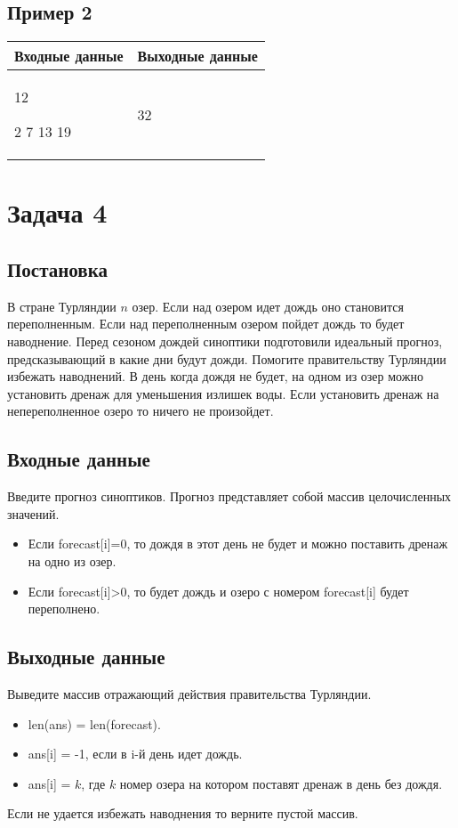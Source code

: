 \documentclass[a4]{article}
\begin{document}
\subsection*{Пример 2}
\label{sec:orge96f7c4}

\begin{table}[H]
\begin{center}
\begin{tabular}{|m{4cm}|m{4cm}|}
\hline
Входные данные & Выходные данные \\ \hline
12 

2 7 13 19
&
32
\\ \hline
\end{tabular}
\end{center}
\end{table}

\pagebreak
\section*{Задача 4}
\label{sec:orgb1f46a6}
\subsection*{Постановка}
\label{sec:orge854c50}
В стране Турляндии \(n\) озер. Если над озером идет дождь оно становится переполненным. Если над переполненным озером пойдет дождь то будет наводнение. Перед сезоном дождей синоптики подготовили идеальный прогноз, предсказывающий в какие дни будут дожди. Помогите правительству Турляндии избежать наводнений. В день когда дождя не будет, на одном из озер можно установить дренаж для уменьшения излишек воды. Если установить дренаж на непереполненное озеро то ничего не произойдет.

\subsection*{Входные данные}
\label{sec:orge854c50}
Введите прогноз синоптиков. Прогноз представляет собой массив целочисленных значений.
\begin{itemize}
    \item Если forecast[i]=0, то дождя в этот день не будет и можно поставить дренаж на одно из озер.
    \item Если forecast[i]>0, то будет дождь и озеро с номером forecast[i] будет переполнено.
 \end{itemize}
\subsection*{Выходные данные}
\label{sec:org1ab7414}
Выведите массив отражающий действия правительства Турляндии.
\begin{itemize}
    \item len(ans) = len(forecast).
    \item ans[i] = -1, если в i-й день идет дождь.
    \item ans[i] = \(k\), где \(k\) номер озера на котором поставят дренаж в день без дождя.
 \end{itemize}
 Если не удается избежать наводнения то верните пустой массив.
\end{document}
